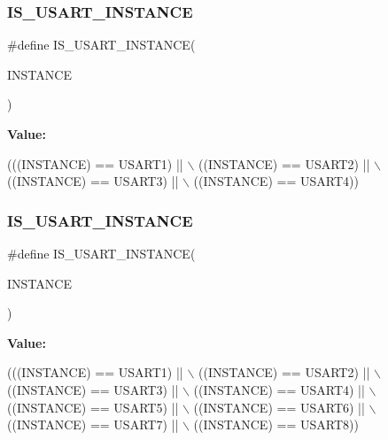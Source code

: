 \subsubsection{\texorpdfstring{I\+S\+\_\+\+U\+S\+A\+R\+T\+\_\+\+I\+N\+S\+T\+A\+N\+CE}{IS\_USART\_INSTANCE}\hspace{0.1cm}{\footnotesize\ttfamily [11/13]}}
{\footnotesize\ttfamily \#define I\+S\+\_\+\+U\+S\+A\+R\+T\+\_\+\+I\+N\+S\+T\+A\+N\+CE(\begin{DoxyParamCaption}\item[{}]{I\+N\+S\+T\+A\+N\+CE }\end{DoxyParamCaption})}

{\bfseries Value\+:}
\begin{DoxyCode}
(((INSTANCE) == USART1) || \(\backslash\)
                                     ((INSTANCE) == USART2) || \(\backslash\)
                                     ((INSTANCE) == USART3) || \(\backslash\)
                                     ((INSTANCE) == USART4))
\end{DoxyCode}
\mbox{\label{group___exported__macro_gafbce654f84a7c994817453695ac91cbe}} 
\subsubsection{\texorpdfstring{I\+S\+\_\+\+U\+S\+A\+R\+T\+\_\+\+I\+N\+S\+T\+A\+N\+CE}{IS\_USART\_INSTANCE}\hspace{0.1cm}{\footnotesize\ttfamily [12/13]}}
{\footnotesize\ttfamily \#define I\+S\+\_\+\+U\+S\+A\+R\+T\+\_\+\+I\+N\+S\+T\+A\+N\+CE(\begin{DoxyParamCaption}\item[{}]{I\+N\+S\+T\+A\+N\+CE }\end{DoxyParamCaption})}

{\bfseries Value\+:}
\begin{DoxyCode}
(((INSTANCE) == USART1) || \(\backslash\)
                                     ((INSTANCE) == USART2) || \(\backslash\)
                                     ((INSTANCE) == USART3) || \(\backslash\)
                                     ((INSTANCE) == USART4) || \(\backslash\)
                                     ((INSTANCE) == USART5) || \(\backslash\)
                                     ((INSTANCE) == USART6) || \(\backslash\)
                                     ((INSTANCE) == USART7) || \(\backslash\)
                                     ((INSTANCE) == USART8))
\end{DoxyCode}
\mbox{\label{group___exported__macro_gafbce654f84a7c994817453695ac91cbe}} 
